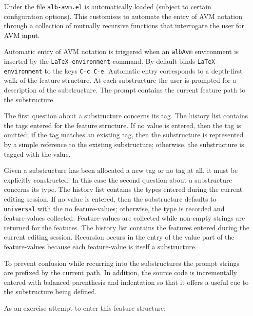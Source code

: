 \documentclass[11pt,a4paper,oneside,titlepage]{alb-corp}
\begin{document}
Under \AUCTeX{} the file \texttt{alb-avm.el} is automatically loaded
(subject to certain \AUCTeX{} configuration options).  This customises
\AUCTeX{} to automate the entry of AVM notation through a collection of
mutually recursive functions that interrogate the user for AVM input.

Automatic entry of AVM notation is triggered when an \texttt{albAvm}
environment is inserted by the \texttt{LaTeX-environment} command.  By
default \AUCTeX{} binds \texttt{LaTeX-environment} to the keys
\texttt{C-c C-e}.  Automatic entry corresponds to a depth-first walk of
the feature structure.  At each substructure the user is prompted for a
description of the substructure.  The prompt contains the current
feature path to the substructure.

The first question about a substructure concerns its tag.  The history
list contains the tags entered for the feature structure.  If no value
is entered, then the tag is omitted; if the tag matches an existing tag,
then the substructure is represented by a simple reference to the
existing substructure; otherwise, the substructure is tagged with the
value.

Given a substructure has been allocated a new tag or no tag at all, it
must be explicitly constructed.  In this case the second question about
a substructure concerns its type.  The history list contains the types
entered during the current editing session.  If no value is entered,
then the substructure defaults to \texttt{universal} with the no
feature-values; otherwise, the type is recorded and feature-values
collected.  Feature-values are collected while non-empty strings are
returned for the features.  The history list contains the features
entered during the current editing session.  Recursion occurs in the
entry of the value part of the feature-values because each feature-value
is itself a substructure.

To prevent confusion while recurring into the substructures the prompt
strings are prefixed by the current path.  In addition, the source code
is incrementally entered with balanced parenthesis and indentation so
that it offers a useful cue to the substructure being defined.

As an exercise attempt to enter this feature structure:

\begin{quote}
  \begin{albAvm}
  \end{albAvm}
\end{quote}
\end{document}
